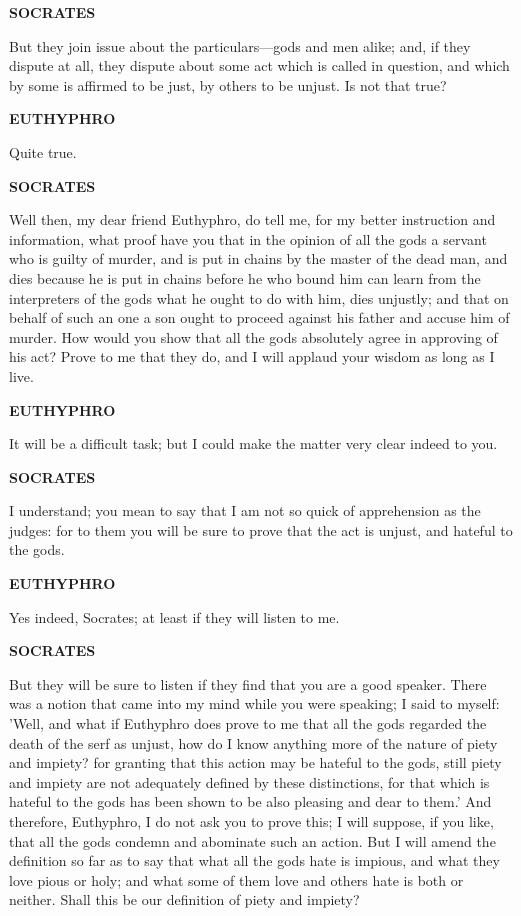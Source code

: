 \documentclass[11pt,letter]{article}
\begin{document}
\par \textbf{SOCRATES}
\par   But they join issue about the particulars—gods and men alike; and, if they dispute at all, they dispute about some act which is called in question, and which by some is affirmed to be just, by others to be unjust. Is not that true?

\par \textbf{EUTHYPHRO}
\par   Quite true.

\par \textbf{SOCRATES}
\par   Well then, my dear friend Euthyphro, do tell me, for my better instruction and information, what proof have you that in the opinion of all the gods a servant who is guilty of murder, and is put in chains by the master of the dead man, and dies because he is put in chains before he who bound him can learn from the interpreters of the gods what he ought to do with him, dies unjustly; and that on behalf of such an one a son ought to proceed against his father and accuse him of murder. How would you show that all the gods absolutely agree in approving of his act? Prove to me that they do, and I will applaud your wisdom as long as I live.

\par \textbf{EUTHYPHRO}
\par   It will be a difficult task; but I could make the matter very clear indeed to you.

\par \textbf{SOCRATES}
\par   I understand; you mean to say that I am not so quick of apprehension as the judges:  for to them you will be sure to prove that the act is unjust, and hateful to the gods.

\par \textbf{EUTHYPHRO}
\par   Yes indeed, Socrates; at least if they will listen to me.

\par \textbf{SOCRATES}
\par   But they will be sure to listen if they find that you are a good speaker. There was a notion that came into my mind while you were speaking; I said to myself:  'Well, and what if Euthyphro does prove to me that all the gods regarded the death of the serf as unjust, how do I know anything more of the nature of piety and impiety? for granting that this action may be hateful to the gods, still piety and impiety are not adequately defined by these distinctions, for that which is hateful to the gods has been shown to be also pleasing and dear to them.' And therefore, Euthyphro, I do not ask you to prove this; I will suppose, if you like, that all the gods condemn and abominate such an action. But I will amend the definition so far as to say that what all the gods hate is impious, and what they love pious or holy; and what some of them love and others hate is both or neither. Shall this be our definition of piety and impiety?
\end{document}
